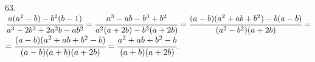 63. $\cfrac{a(a^2-b)-b^2(b-1)}{a^3-2b^3+2a^2b-ab^2}=\cfrac{a^3-ab-b^3+b^2}{a^2(a+2b)-b^2(a+2b)}=
\cfrac{(a-b)(a^2+ab+b^2)-b(a-b)}{(a^2-b^2)(a+2b)}=$\\$=\cfrac{(a-b)(a^2+ab+b^2-b)}{(a-b)(a+b)(a+2b)}=
\cfrac{a^2+ab+b^2-b}{(a+b)(a+2b)}.$\\
